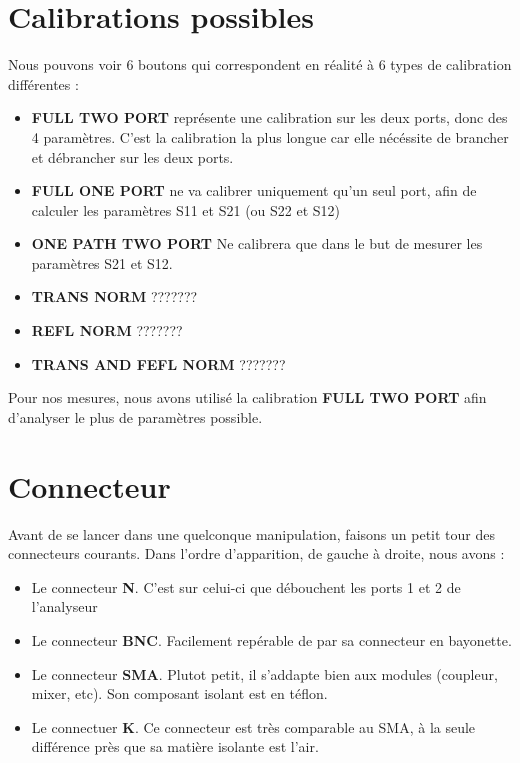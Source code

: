 \documentclass[a4paper,12pt]{report}            %
\begin{document}
\newpage

\section{Calibrations possibles}
Nous pouvons voir 6 boutons qui correspondent en réalité à 6 types de calibration
différentes :
\begin{itemize}
	\item \textbf{FULL TWO PORT} représente une calibration sur les deux ports, donc des 4 paramètres.
	      C'est la calibration la plus longue car elle nécéssite de brancher et débrancher sur les deux ports.
	\item \textbf{FULL ONE PORT} ne va calibrer uniquement qu'un seul port, afin de calculer les paramètres
	      S11 et S21 (ou S22 et S12)
	\item \textbf{ONE PATH TWO PORT} Ne calibrera que dans le but de mesurer les paramètres S21 et S12.
	\item \textbf{TRANS NORM} ???????
	\item \textbf{REFL NORM} ???????
	\item \textbf{TRANS AND FEFL NORM} ???????
\end{itemize}
Pour nos mesures, nous avons utilisé la calibration \textbf{FULL TWO PORT} afin
d'analyser le plus de paramètres possible.  

\section{Connecteur}

Avant de se lancer dans une quelconque manipulation, faisons un petit tour des connecteurs
courants. Dans l'ordre d'apparition, de gauche à droite, nous avons :
\begin{itemize}
	\item Le connecteur \textbf{N}. C'est sur celui-ci que débouchent les ports 1 et 2 de l'analyseur
	\item Le connecteur \textbf{BNC}. Facilement repérable de par sa connecteur en bayonette.
	\item Le connecteur \textbf{SMA}. Plutot petit, il s'addapte bien aux modules (coupleur, mixer, etc). Son
	      composant isolant est en téflon.
	\item Le connectuer \textbf{K}. Ce connecteur est très comparable au SMA, à la seule différence près
	      que sa matière isolante est l'air.
\end{itemize}
\end{document}
